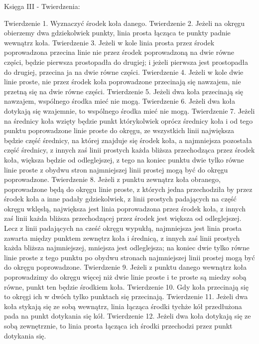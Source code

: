 Księga III - Twierdzenia:

Twierdzenie 1.
    Wyznaczyć środek koła danego.
Twierdzenie 2.
    Jeżeli na okręgu obierzemy dwa gdziekolwiek punkty, linia prosta łącząca te punkty padnie wewnątrz koła.
Twierdzenie 3.
    Jeżeli w kole linia prosta przez środek poprowadzona przecina linie nie przez środek poprowadzoną na dwie równe części, będzie pierwsza prostopadła do drugiej; i jeżeli pierwsza jest prostopadła do drugiej, przecina ja na dwie równe części.
Twierdzenie 4.
    Jeżeli w kole dwie linie proste, nie przez środek koła poprowadzone przecinają się nawzajem, nie przetną się na dwie równe części. 
Twierdzenie 5.
    Jeżeli dwa koła przecinają się nawzajem, wspólnego środka mieć nie mogą.
Twierdzenie 6.
    Jeżeli dwa koła dotykają się wzajemnie, to wspólnego środka mieć nie mogą.
Twierdzenie 7.
    Jeżeli na średnicy koła wzięty będzie punkt którykolwiek oprócz średnicy koła i od tego punktu poprowadzone linie proste do okręgu, ze wszystkich linii największa będzie część średnicy, na której znajduje się środek koła, a najmniejsza pozostała część średnicy, z innych zaś linii prostych każda bliższa przechodząca przez środek koła, większa będzie od odleglejszej, z tego na koniec punktu dwie tylko równe linie proste z obydwu stron najmniejszej linii prostej mogą być do okręgu poprowadzone.
Twierdzenie 8.
    Jeżeli z punktu zewnątrz koła obranego, poprowadzone będą do okręgu linie proste, z których jedna przechodziła by przez środek koła a inne padały gdziekolwiek, z linii prostych padających na część okręgu wklęsłą, największa jest linia poprowadzona przez środek koła, z innych zaś linii każda bliższa przechodzącej przez środek jest większa od odleglejszej. Lecz z linii padających na cześć okręgu wypukłą, najmniejsza jest linia prosta zawarta między punktem zewnętrz koła i średnicą, z innych zaś linii prostych każda bliższa najmniejszej, mniejsza jest odleglejsza; na koniec dwie tylko równe linie proste z tego punktu po obydwu stronach najmniejszej linii prostej mogą być do okręgu poprowadzone.
Twierdzenie 9.
    Jeżeli z punktu danego wewnątrz koła poprowadzimy do okręgu więcej niż dwie linie proste i te proste są miedzy sobą równe, punkt ten będzie środkiem koła.
Twierdzenie 10.
    Gdy koła przecinają się to okręgi ich w dwóch tylko punktach się przecinają.
Twierdzenie 11.
    Jeżeli dwa koła stykają się ze sobą wewnątrz, linia łącząca środki tychże kół przedłużona pada na punkt dotykania się kół.
Twierdzenie 12.
    Jeżeli dwa koła dotykają się ze sobą zewnętrznie, to linia prosta łącząca ich środki przechodzi przez punkt dotykania się.
